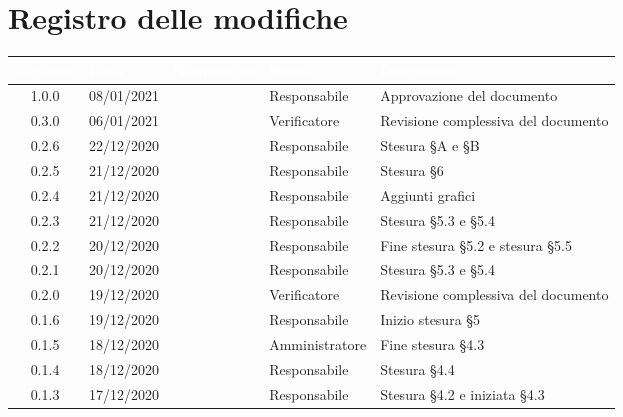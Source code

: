 \section*{Registro delle modifiche}
{
\renewcommand{\arraystretch}{1.5}
\centering
\begin{longtable}{c C{2.6cm} C{3cm} C{3cm} C{5cm}}
\textcolor{white}{\textbf{Versione}}&
\textcolor{white}{\textbf{Data}}&
\textcolor{white}{\textbf{Nominativo}}&
\textcolor{white}{\textbf{Ruolo}}&
\textcolor{white}{\textbf{Descrizione}}\\	
\endhead

1.0.0 & 08/01/2021 & \SG{} & Responsabile & Approvazione del documento \\

0.3.0 & 06/01/2021 & \SH{} & Verificatore & Revisione complessiva del documento \\

0.2.6 & 22/12/2020 & \BM{} & Responsabile & Stesura \S A e \S B \\

0.2.5 & 21/12/2020 & \BM{} & Responsabile & Stesura \S 6\\

0.2.4 & 21/12/2020 & \SG{} & Responsabile & Aggiunti grafici \\

0.2.3 & 21/12/2020 & \BM{} & Responsabile & Stesura \S 5.3 e \S 5.4\\

0.2.2 & 20/12/2020 & \SG{} & Responsabile & Fine stesura \S 5.2 e stesura \S 5.5 \\

0.2.1 & 20/12/2020 & \BM{} & Responsabile & Stesura \S 5.3 e \S 5.4\\

0.2.0 & 19/12/2020 & \ZM{} & Verificatore & Revisione complessiva del documento \\

0.1.6 & 19/12/2020 & \SG{} & Responsabile & Inizio stesura \S 5 \\

0.1.5 & 18/12/2020 & \PA{} & Amministratore & Fine stesura \S 4.3\\

0.1.4 & 18/12/2020 & \SG{} & Responsabile & Stesura \S 4.4 \\

0.1.3 & 17/12/2020 & \BM{} & Responsabile & Stesura \S 4.2 e iniziata \S 4.3 \\


\end{longtable}}
